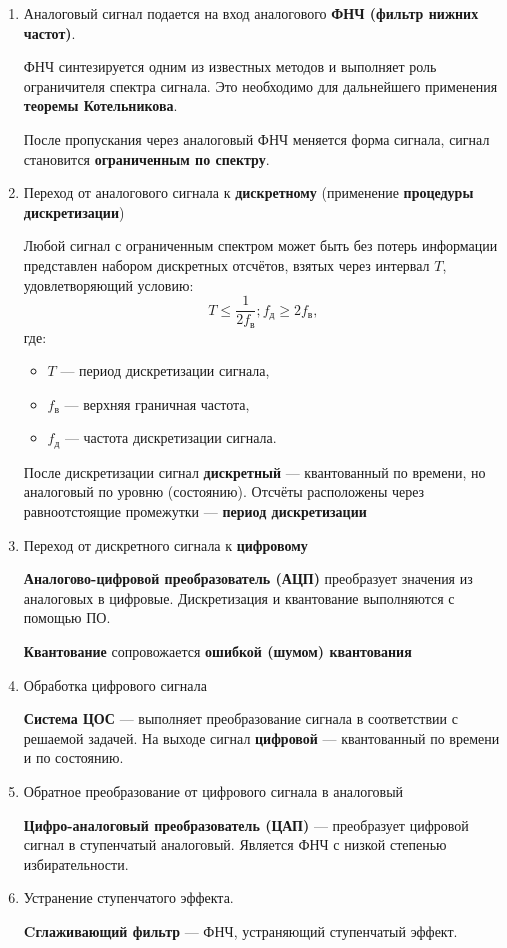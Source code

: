 \documentclass[a4paper, 14pt]{extarticle}
\begin{document}
\begin{enumerate}
    \item Аналоговый сигнал подается на вход аналогового \textbf{ФНЧ (фильтр нижних частот)}.

        ФНЧ синтезируется одним из известных методов и выполняет роль ограничителя спектра сигнала. Это необходимо для дальнейшего применения \textbf{теоремы Котельникова}.

        После пропускания через аналоговый ФНЧ меняется форма сигнала, сигнал становится \textbf{ограниченным по спектру}.
    \item Переход от аналогового сигнала к \textbf{дискретному} (применение \textbf{процедуры дискретизации})
        \begin{tcolorbox}[title=Теорема Котельникова]
            Любой сигнал с ограниченным спектром может быть без потерь информации представлен набором дискретных отсчётов, взятых через интервал $T$, удовлетворяющий условию:
            \begin{equation*}
                T \le \frac{1}{2f_\text{в}}; f_\text{д} \ge 2f_\text{в},
            \end{equation*}
            где:
            \begin{itemize}
                \item $T$ --- период дискретизации сигнала,
                \item $f_\text{в} $ --- верхняя граничная частота,
                \item $f_\text{д}$ --- частота дискретизации сигнала.
            \end{itemize}

            После дискретизации сигнал \textbf{дискретный} --- квантованный по времени, но аналоговый по уровню (состоянию). Отсчёты расположены через равноотстоящие промежутки --- \textbf{период дискретизации}

        \end{tcolorbox}
    \item Переход от дискретного сигнала к \textbf{цифровому}

        \textbf{Аналогово-цифровой преобразователь (АЦП)} преобразует значения из аналоговых в цифровые. Дискретизация и квантование выполняются с помощью ПО.

        \textbf{Квантование} сопровожается \textbf{ошибкой (шумом) квантования}
    \item Обработка цифрового сигнала

        \textbf{Система ЦОС} --- выполняет преобразование сигнала в соответствии с решаемой задачей. На выходе сигнал \textbf{цифровой} --- квантованный по времени и по состоянию.


    \item Обратное преобразование от цифрового сигнала в аналоговый

        \textbf{Цифро-аналоговый преобразователь (ЦАП)} --- преобразует цифровой сигнал в ступенчатый аналоговый. Является ФНЧ с низкой степенью избирательности.
    \item Устранение ступенчатого эффекта.

        \textbf{Cглаживающий фильтр} --- ФНЧ, устраняющий ступенчатый эффект.
\end{enumerate}
\end{document}
